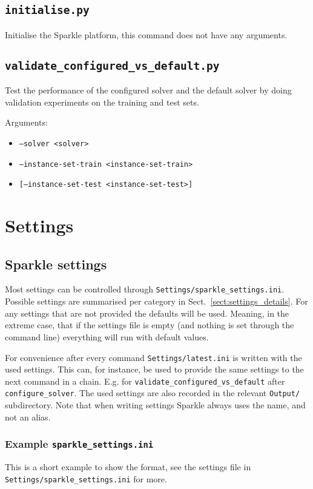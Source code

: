 \documentclass{article}
\begin{document}
\subsection{\texttt{initialise.py}}
\label{cmd:initialise}

Initialise the Sparkle platform, this command does not have any arguments.

\subsection{\texttt{validate\_configured\_vs\_default.py}}
\label{cmd:validate_configured_vs_default}
Test the performance of the configured solver and the default solver by doing validation experiments on the training and test sets.

Arguments:
\begin{itemize}[noitemsep]
  \item[] \texttt{--solver <solver>}
  \item[] \texttt{--instance-set-train <instance-set-train>}
  \item[] \texttt{[--instance-set-test <instance-set-test>]}
\end{itemize}

\section{Settings}

\subsection{Sparkle settings}
Most settings can be controlled through \texttt{Settings/sparkle\_settings.ini}. Possible settings are summarised per category in Sect.~\ref{sect:settings_details}. For any settings that are not provided the defaults will be used. Meaning, in the extreme case, that if the settings file is empty (and nothing is set through the command line) everything will run with default values.

For convenience after every command \texttt{Settings/latest.ini} is written with the used settings. This can, for instance, be used to provide the same settings to the next command in a chain. E.g. for \texttt{validate\_configured\_vs\_default} after \texttt{configure\_solver}. The used settings are also recorded in the relevant \texttt{Output/} subdirectory. Note that when writing settings Sparkle always uses the name, and not an alias.

\subsubsection{Example \texttt{sparkle\_settings.ini}}
This is a short example to show the format, see the settings file in \texttt{Settings/sparkle\_settings.ini} for more.
\end{document}
